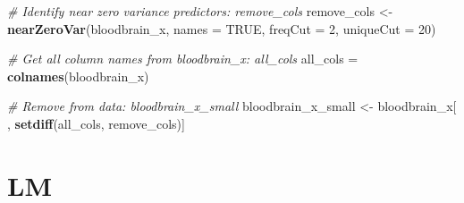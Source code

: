 \documentclass[]{book}
\newenvironment{Shaded}{\begin{snugshade}}{\end{snugshade}}
\newcommand{\KeywordTok}[1]{\textcolor[rgb]{0.13,0.29,0.53}{\textbf{#1}}}
\newcommand{\DataTypeTok}[1]{\textcolor[rgb]{0.13,0.29,0.53}{#1}}
\newcommand{\DecValTok}[1]{\textcolor[rgb]{0.00,0.00,0.81}{#1}}
\newcommand{\StringTok}[1]{\textcolor[rgb]{0.31,0.60,0.02}{#1}}
\newcommand{\CommentTok}[1]{\textcolor[rgb]{0.56,0.35,0.01}{\textit{#1}}}
\newcommand{\OtherTok}[1]{\textcolor[rgb]{0.56,0.35,0.01}{#1}}
\newcommand{\OperatorTok}[1]{\textcolor[rgb]{0.81,0.36,0.00}{\textbf{#1}}}
\newcommand{\NormalTok}[1]{#1}
\theoremstyle{definition}
\theoremstyle{definition}
\theoremstyle{definition}
\theoremstyle{remark}
\begin{document}
\begin{Shaded}
\end{Shaded}

\begin{Shaded}
\begin{Highlighting}[]
\CommentTok{# Identify near zero variance predictors: remove_cols}
\NormalTok{remove_cols <-}\StringTok{ }\KeywordTok{nearZeroVar}\NormalTok{(bloodbrain_x, }\DataTypeTok{names =} \OtherTok{TRUE}\NormalTok{, }
                           \DataTypeTok{freqCut =} \DecValTok{2}\NormalTok{, }\DataTypeTok{uniqueCut =} \DecValTok{20}\NormalTok{)}

\CommentTok{# Get all column names from bloodbrain_x: all_cols}
\NormalTok{all_cols =}\StringTok{ }\KeywordTok{colnames}\NormalTok{(bloodbrain_x)}

\CommentTok{# Remove from data: bloodbrain_x_small}
\NormalTok{bloodbrain_x_small <-}\StringTok{ }\NormalTok{bloodbrain_x[ , }\KeywordTok{setdiff}\NormalTok{(all_cols, remove_cols)]}
\end{Highlighting}
\end{Shaded}

\section{LM}\label{lm}
\end{document}
